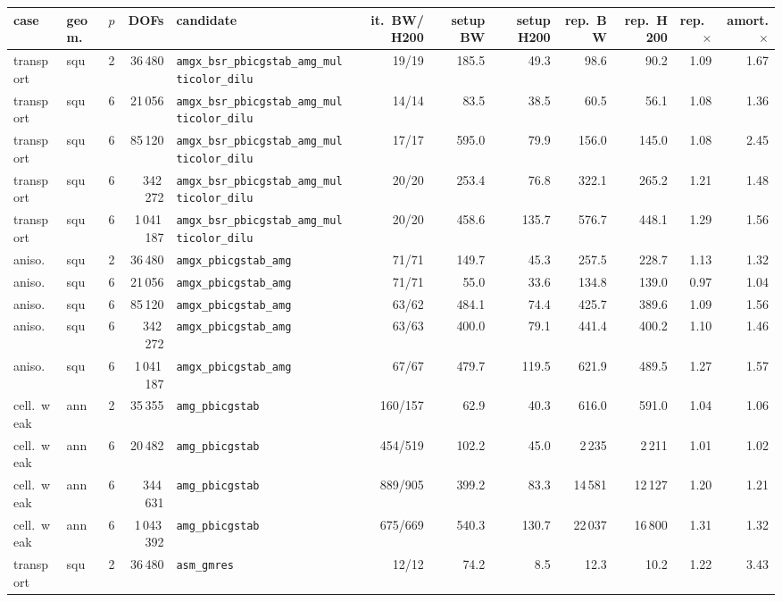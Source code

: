 \begin{tabular}{llrrlrrrrrrr}
\toprule
case & geom. & $p$ & DOFs & candidate & it.\ BW/H200 & setup BW & setup H200 & rep.\ BW & rep.\ H200 & rep.\ $\times$ & amort.\ $\times$\\
\midrule
transport & squ & 2 & 36\,480 & \texttt{amgx\_bsr\_pbicgstab\_amg\_multicolor\_dilu} & 19/19 & 185.5 & 49.3 & 98.6 & 90.2 & 1.09 & 1.67\\
transport & squ & 6 & 21\,056 & \texttt{amgx\_bsr\_pbicgstab\_amg\_multicolor\_dilu} & 14/14 & 83.5 & 38.5 & 60.5 & 56.1 & 1.08 & 1.36\\
transport & squ & 6 & 85\,120 & \texttt{amgx\_bsr\_pbicgstab\_amg\_multicolor\_dilu} & 17/17 & 595.0 & 79.9 & 156.0 & 145.0 & 1.08 & 2.45\\
transport & squ & 6 & 342\,272 & \texttt{amgx\_bsr\_pbicgstab\_amg\_multicolor\_dilu} & 20/20 & 253.4 & 76.8 & 322.1 & 265.2 & 1.21 & 1.48\\
transport & squ & 6 & 1\,041\,187 & \texttt{amgx\_bsr\_pbicgstab\_amg\_multicolor\_dilu} & 20/20 & 458.6 & 135.7 & 576.7 & 448.1 & 1.29 & 1.56\\
aniso. & squ & 2 & 36\,480 & \texttt{amgx\_pbicgstab\_amg} & 71/71 & 149.7 & 45.3 & 257.5 & 228.7 & 1.13 & 1.32\\
aniso. & squ & 6 & 21\,056 & \texttt{amgx\_pbicgstab\_amg} & 71/71 & 55.0 & 33.6 & 134.8 & 139.0 & 0.97 & 1.04\\
aniso. & squ & 6 & 85\,120 & \texttt{amgx\_pbicgstab\_amg} & 63/62 & 484.1 & 74.4 & 425.7 & 389.6 & 1.09 & 1.56\\
aniso. & squ & 6 & 342\,272 & \texttt{amgx\_pbicgstab\_amg} & 63/63 & 400.0 & 79.1 & 441.4 & 400.2 & 1.10 & 1.46\\
aniso. & squ & 6 & 1\,041\,187 & \texttt{amgx\_pbicgstab\_amg} & 67/67 & 479.7 & 119.5 & 621.9 & 489.5 & 1.27 & 1.57\\
cell.\ weak & ann & 2 & 35\,355 & \texttt{amg\_pbicgstab} & 160/157 & 62.9 & 40.3 & 616.0 & 591.0 & 1.04 & 1.06\\
cell.\ weak & ann & 6 & 20\,482 & \texttt{amg\_pbicgstab} & 454/519 & 102.2 & 45.0 & 2\,235 & 2\,211 & 1.01 & 1.02\\
cell.\ weak & ann & 6 & 344\,631 & \texttt{amg\_pbicgstab} & 889/905 & 399.2 & 83.3 & 14\,581 & 12\,127 & 1.20 & 1.21\\
cell.\ weak & ann & 6 & 1\,043\,392 & \texttt{amg\_pbicgstab} & 675/669 & 540.3 & 130.7 & 22\,037 & 16\,800 & 1.31 & 1.32\\
transport & squ & 2 & 36\,480 & \texttt{asm\_gmres} & 12/12 & 74.2 & 8.5 & 12.3 & 10.2 & 1.22 & 3.43\\

\end{tabular}
